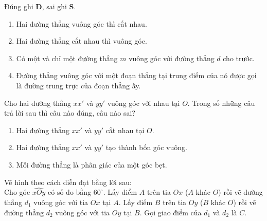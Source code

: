 \begin{vn}
Đúng ghi \textbf{Đ}, sai ghi \textbf{S}.
\begin{enumerate}
	\item Hai đường thẳng vuông góc thì cắt nhau.\hfill {}
	\item Hai đường thẳng cắt nhau thì vuông góc.\hfill {}
	\item Có một và chỉ một đường thẳng $ m $ vuông góc với đường thẳng $ d $ cho trước.\hfill {}
	\item Đường thẳng vuông góc với một đoạn thẳng tại trung điểm của nó được gọi là đường trung trực của đoạn thẳng ấy.\hfill {}
\end{enumerate}
\end{vn}

\begin{vn}
Cho hai đường thẳng $ xx' $ và $ yy' $ vuông góc với nhau tại $ O $. Trong số những câu trả lời sau thì câu nào đúng, câu nào sai?
	\begin{enumerate}
		\item Hai đường thẳng $ xx' $ và $ yy' $ cắt nhau tại $ O $.\hfill {}
		\item Hai đường thẳng $ xx' $ và $ yy' $ tạo thành bốn góc vuông.\hfill {}
		\item Mỗi đường thẳng là phân giác của một góc bẹt.\hfill {}
	\end{enumerate}
\end{vn}


\begin{vn}
Vẽ hình theo cách diễn đạt bằng lời sau:\\
Cho góc $ \widehat{xOy} $ có số đo bằng $ 60^\circ $. Lấy điểm $ A $ trên tia $ Ox $ ($ A $ khác $ O $) rồi vẽ đường thẳng $d_1$ vuông góc với tia $ Ox $ tại $ A $. Lấy điểm $ B $ trên tia $ Oy $ ($ B $ khác $ O $) rồi vẽ đường thẳng $ d_2 $ vuông góc với tia $ Oy $ tại $ B $. Gọi giao điểm của $ d_1 $ và $ d_2 $ là $ C $.
\end{vn}

